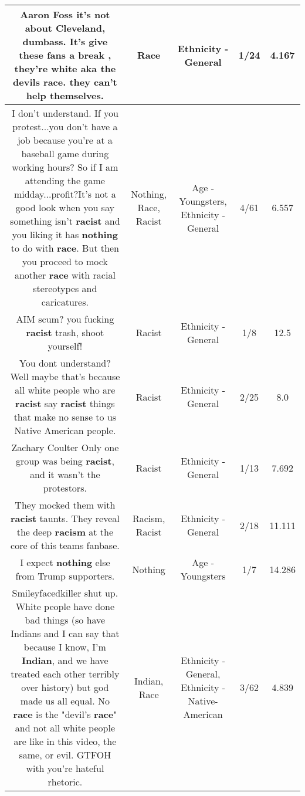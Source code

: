 \documentclass[11pt]{article}
\newlength\mylength
\begin{document}
\begin{center}
\begin{longtable}{|C{.65\mylength}|C{.30\mylength}|C{.12\mylength}|C{.12\mylength}|C{.12\mylength}|}
  \small Aaron Foss it's not about Cleveland, dumbass.  It's give these fans a break , they're white aka the devils \textbf{race}. they can't help themselves.\normalsize   & Race & Ethnicity - General & 1/24 & 4.167 \\  \hline
  \small I don't understand. If you protest...you don't have a job because you're at a baseball game during working hours? So if I am attending the game midday...profit?It's not a good look when you say something isn't \textbf{racist} and you liking it has \textbf{nothing} to do with \textbf{race}. But then you proceed to mock another \textbf{race} with racial stereotypes and caricatures.\normalsize   & Nothing, Race, Racist & Age - Youngsters, Ethnicity - General & 4/61 & 6.557 \\  \hline
  \small AIM scum? you fucking \textbf{racist} trash, shoot yourself!\normalsize   & Racist & Ethnicity - General & 1/8 & 12.5 \\  \hline
  \small You dont understand? Well maybe that's because all white people who are \textbf{racist} say \textbf{racist} things that make no sense to us Native American people.\normalsize   & Racist & Ethnicity - General & 2/25 & 8.0 \\  \hline
  \small Zachary Coulter Only one group was being \textbf{racist}, and it wasn't the protestors.\normalsize   & Racist & Ethnicity - General & 1/13 & 7.692 \\  \hline
  \small They mocked them with \textbf{racist} taunts. They reveal the deep \textbf{racism} at the core of this teams fanbase.\normalsize   & Racism, Racist & Ethnicity - General & 2/18 & 11.111 \\  \hline
  \small I expect \textbf{nothing} else from Trump supporters.\normalsize   & Nothing & Age - Youngsters & 1/7 & 14.286 \\  \hline
  \small Smileyfacedkiller shut up. White people have done bad things (so have Indians and I can say that because I know, I'm \textbf{Indian}, and we have treated each other terribly over history) but god made us all equal. No \textbf{race} is the "devil's \textbf{race}" and not all white people are like in this video, the same, or evil. GTFOH with you're hateful rhetoric.\normalsize   & Indian, Race & Ethnicity - General, Ethnicity - Native-American & 3/62 & 4.839 \\  \hline

\end{longtable}
\end{center}
\end{document}
